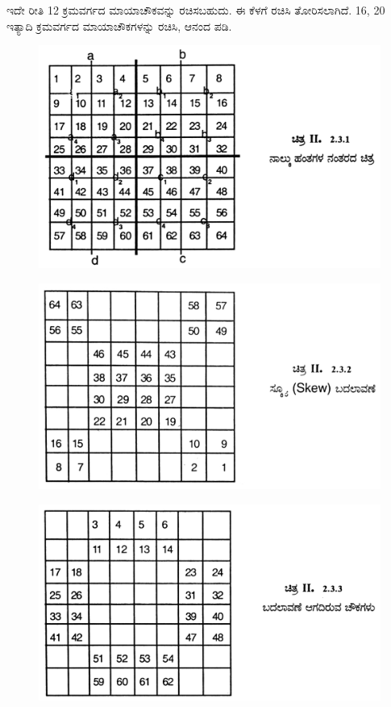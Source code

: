 ಇದೇ ರೀತಿ 12 ಕ್ರಮವರ್ಗದ ಮಾಯಾಚೌಕವನ್ನು ರಚಿಸಬಹುದು. ಈ ಕೆಳಗೆ ರಚಿಸಿ ತೋರಿಸಲಾಗಿದೆ. 16, 20 ಇತ್ಯಾದಿ ಕ್ರಮವರ್ಗದ ಮಾಯಾಚೌಕಗಳನ್ನು ರಚಿಸಿ, ಆನಂದ ಪಡಿ.
\begin{figure}[H]
\includegraphics[scale=.85]{src/figures/chap3/fig3.24.jpg}
\end{figure}
\begin{figure}[H]
\includegraphics[scale=.85]{src/figures/chap3/fig3.25.jpg}
\end{figure}
\begin{figure}[H]
\includegraphics[scale=.85]{src/figures/chap3/fig3.26.jpg}
\end{figure}

